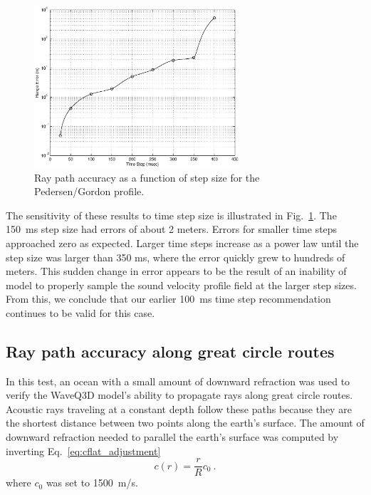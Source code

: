 \documentclass{ws-jca}
\begin{document}
\begin{figure}[th]
	\centerline{\includegraphics[width=3in]{refraction_pedersen_sensitivity.eps}} 
	\vspace*{8pt}
	\caption{Ray path accuracy as a function of step size 
		for the Pedersen/Gordon profile. 
	\label{fig:refraction_pedersen_sensitivity}}
\end{figure}
The sensitivity of these results to time step size is illustrated in
Fig.~\ref{fig:refraction_pedersen_sensitivity}. The 150~ms step size had
errors of about 2 meters. Errors for smaller time steps approached zero as
expected. Larger time steps increase as a power law until the step size was
larger than 350 ms, where the error quickly grew to hundreds of meters.
This sudden change in error appears to be the result of an inability of
model to properly sample the sound velocity profile field at the larger
step sizes. From this, we conclude that our earlier 100~ms time step
recommendation continues to be valid for this case.

\subsection{Ray path accuracy along great circle routes}

In this test, an ocean with a small amount of downward refraction was used
to verify the WaveQ3D model's ability to propagate rays along great circle
routes. Acoustic rays traveling at a constant depth follow these paths
because they are the shortest distance between two points along the
earth's surface. The amount of downward refraction needed to parallel the
earth's surface was computed by inverting Eq.~\ref{eq:cflat_adjustment}
\begin{equation}
	c(r) = \frac{r}{R} c_0  \:.
	\label{eq:chorizontal}
\end{equation}
where \(c_0\) was set to 1500~m/s. 
\end{document}
